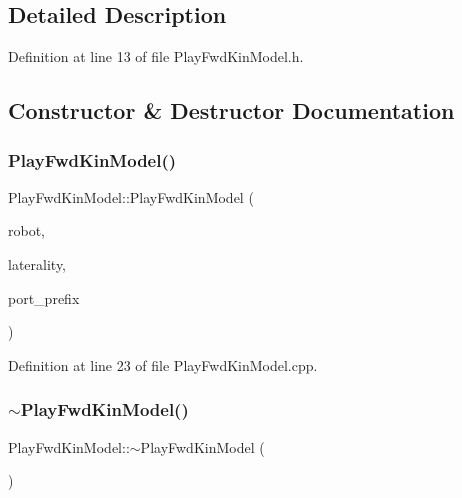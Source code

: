 \subsection{Detailed Description}


Definition at line 13 of file Play\+Fwd\+Kin\+Model.\+h.



\subsection{Constructor \& Destructor Documentation}
\mbox{\label{classPlayFwdKinModel_aa7dbbe09aed1e7d1a1ac3fc37807f57c}} 
\subsubsection{\texorpdfstring{Play\+Fwd\+Kin\+Model()}{PlayFwdKinModel()}}
{\footnotesize\ttfamily Play\+Fwd\+Kin\+Model\+::\+Play\+Fwd\+Kin\+Model (\begin{DoxyParamCaption}\item[{const yarp\+::os\+::\+Const\+String \&}]{robot,  }\item[{const yarp\+::os\+::\+Const\+String \&}]{laterality,  }\item[{const yarp\+::os\+::\+Const\+String \&}]{port\+\_\+prefix }\end{DoxyParamCaption})\hspace{0.3cm}{\ttfamily [noexcept]}}



Definition at line 23 of file Play\+Fwd\+Kin\+Model.\+cpp.

\mbox{\label{classPlayFwdKinModel_a0af36404764e109bedacd8648939ba9c}} 
\subsubsection{\texorpdfstring{$\sim$\+Play\+Fwd\+Kin\+Model()}{~PlayFwdKinModel()}}
{\footnotesize\ttfamily Play\+Fwd\+Kin\+Model\+::$\sim$\+Play\+Fwd\+Kin\+Model (\begin{DoxyParamCaption}{ }\end{DoxyParamCaption})\hspace{0.3cm}{\ttfamily [noexcept]}}



